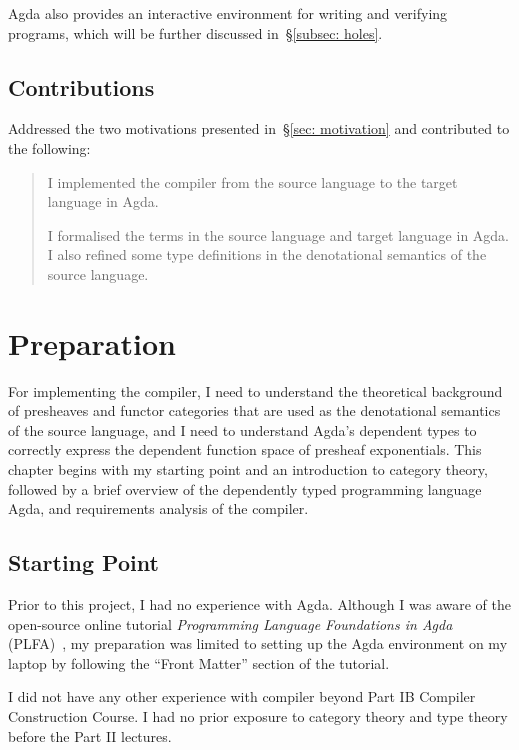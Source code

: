 \documentclass[12pt,twoside,a4paper]{report}
\theoremstyle{definition}
\theoremstyle{definition}
\theoremstyle{definition}
\theoremstyle{definition}
\newcounter{motivation}
\newcommand{\secref}[1]{\S\ref{#1}}
\begin{document}
        Agda also provides an interactive environment for writing and verifying programs, which will be further discussed in~\secref{subsec: holes}.

    \section{Contributions}
        Addressed the two motivations presented in~\secref{sec: motivation} and contributed to the following:
        \begin{quote}
            \savedmotivationI
            I implemented the compiler from the source language to the target language in Agda. 

            \savedmotivationII
            I formalised the terms in the source language and target language in Agda. I also refined some type definitions in the denotational semantics of the source language.

        \end{quote}


\chapter{Preparation}
    \minitoc

    For implementing the compiler, I need to understand the theoretical background of presheaves and functor categories that are used as the denotational semantics of the source language, and I need to understand Agda's dependent types to correctly express the dependent function space of presheaf exponentials. This chapter begins with my starting point and an introduction to category theory, followed by a brief overview of the dependently typed programming language Agda, and requirements analysis of the compiler.

    \section{Starting Point}
    Prior to this project, I had no experience with Agda. Although I was aware of the open-source online tutorial \textit{Programming Language Foundations in Agda} (PLFA)~\cite{plfa}, my preparation was limited to setting up the Agda environment on my laptop by following the ``Front Matter'' section of the tutorial.

    I did not have any other experience with compiler beyond Part IB Compiler Construction Course. I had no prior exposure to category theory and type theory before the Part II lectures.
\end{document}

